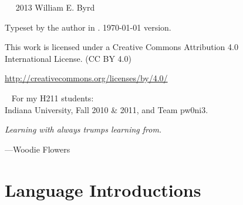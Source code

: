 \documentclass[11pt]{book}
\newcommand{\blankpage}{\newpage\hbox{}\thispagestyle{empty}\newpage} %
\begin{document}
\begin{schemeregion}

\frontmatter
{} %



\blankpage




\newpage

~\vfill
\thispagestyle{empty}
\setlength{\parindent}{0pt}
\setlength{\parskip}{\baselineskip}
\large
\noindent
\textcopyright~2013 William E. Byrd

\noindent
Typeset by the author in \XeLaTeX.
\today\xspace version.

\huge
\noindent
\ccLogo
\ccAttribution

\large
\noindent
This work is licensed under a Creative Commons Attribution 4.0\\International License.
(CC BY 4.0)

\noindent
\url{http://creativecommons.org/licenses/by/4.0/}
\normalsize



\cleardoublepage
\thispagestyle{empty}
~\vfill
\Large
For my H211 students: \\Indiana University, Fall 2010 \& 2011, and Team pw0ni3.
\begin{flushright}
\Large
\vspace{5mm}
\textit{Learning with always trumps learning from.}

---Woodie Flowers
\end{flushright}
\vfill
\vfill
\normalsize

\blankpage

\tableofcontents



\mainmatter
{}




\chapter{Language Introductions}

\end{schemeregion}
\end{document}
